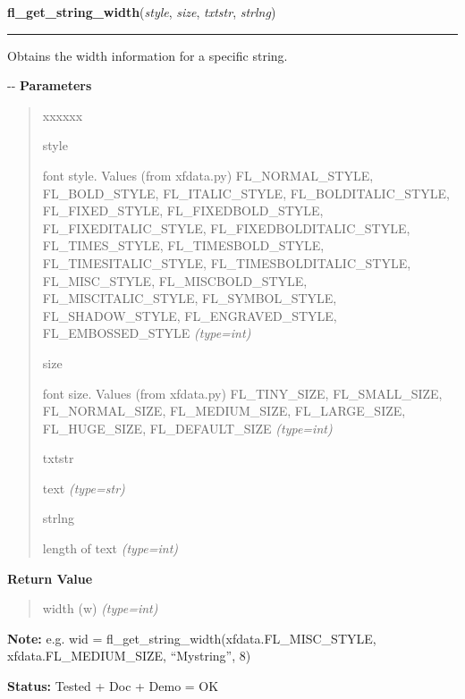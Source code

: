 \hspace{.8\funcindent}\begin{boxedminipage}{\funcwidth}

    \raggedright \textbf{fl\_get\_string\_width}(\textit{style}, \textit{size}, \textit{txtstr}, \textit{strlng})

    \vspace{-1.5ex}

    \rule{\textwidth}{0.5\fboxrule}
\setlength{\parskip}{2ex}

Obtains the width information for a specific string.

-{}-
\setlength{\parskip}{1ex}
      \textbf{Parameters}
      \vspace{-1ex}

      \begin{quote}
        \begin{Ventry}{xxxxxx}

          \item[style]


font style. Values (from xfdata.py) FL\_NORMAL\_STYLE, FL\_BOLD\_STYLE,
FL\_ITALIC\_STYLE, FL\_BOLDITALIC\_STYLE, FL\_FIXED\_STYLE,
FL\_FIXEDBOLD\_STYLE, FL\_FIXEDITALIC\_STYLE, FL\_FIXEDBOLDITALIC\_STYLE,
FL\_TIMES\_STYLE, FL\_TIMESBOLD\_STYLE, FL\_TIMESITALIC\_STYLE,
FL\_TIMESBOLDITALIC\_STYLE, FL\_MISC\_STYLE, FL\_MISCBOLD\_STYLE,
FL\_MISCITALIC\_STYLE, FL\_SYMBOL\_STYLE, FL\_SHADOW\_STYLE,
FL\_ENGRAVED\_STYLE, FL\_EMBOSSED\_STYLE
            {\it (type=int)}

          \item[size]


font size. Values (from xfdata.py) FL\_TINY\_SIZE, FL\_SMALL\_SIZE,
FL\_NORMAL\_SIZE, FL\_MEDIUM\_SIZE, FL\_LARGE\_SIZE, FL\_HUGE\_SIZE,
FL\_DEFAULT\_SIZE
            {\it (type=int)}

          \item[txtstr]


text
            {\it (type=str)}

          \item[strlng]


length of text
            {\it (type=int)}

        \end{Ventry}

      \end{quote}

      \textbf{Return Value}
    \vspace{-1ex}

      \begin{quote}

width (w)
      {\it (type=int)}

      \end{quote}

\textbf{Note:} 
e.g. wid = fl\_get\_string\_width(xfdata.FL\_MISC\_STYLE,
xfdata.FL\_MEDIUM\_SIZE, ``Mystring'', 8)


\textbf{Status:} 
Tested + Doc + Demo = OK


    \end{boxedminipage}

